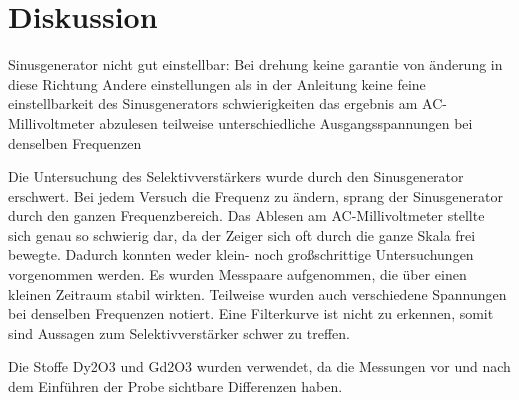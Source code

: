 \section{Diskussion}
\label{sec:Diskussion}
Sinusgenerator nicht gut einstellbar: Bei drehung keine garantie von änderung in diese Richtung
Andere einstellungen als in der Anleitung
keine feine einstellbarkeit des Sinusgenerators
schwierigkeiten das ergebnis am AC-Millivoltmeter abzulesen
teilweise unterschiedliche Ausgangsspannungen bei denselben Frequenzen

Die Untersuchung des Selektivverstärkers wurde durch den Sinusgenerator erschwert.
Bei jedem Versuch die Frequenz zu ändern, sprang der Sinusgenerator durch den ganzen Frequenzbereich.
Das Ablesen am AC-Millivoltmeter stellte sich genau so schwierig dar, da der Zeiger sich oft durch die ganze Skala frei bewegte.
Dadurch konnten weder klein- noch großschrittige Untersuchungen vorgenommen werden.
Es wurden Messpaare aufgenommen, die über einen kleinen Zeitraum stabil wirkten.
Teilweise wurden auch verschiedene Spannungen bei denselben Frequenzen notiert.
Eine Filterkurve ist nicht zu erkennen, somit sind Aussagen zum Selektivverstärker schwer zu treffen.

Die Stoffe Dy2O3 und Gd2O3 wurden verwendet, da die Messungen vor und nach dem Einführen der Probe sichtbare Differenzen haben.
